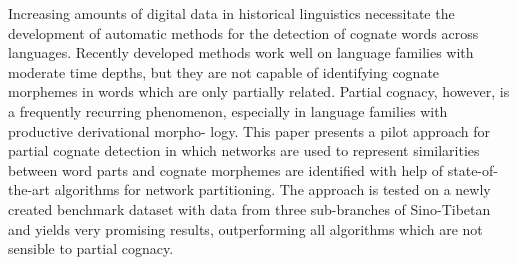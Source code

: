 Increasing amounts of digital data in historical linguistics necessitate the development of automatic methods for the detection of cognate words across languages.  Recently developed methods work well on language families with moderate time depths, but they are not capable of identifying cognate morphemes in words which are only partially related. Partial cognacy, however, is a frequently recurring phenomenon, especially in language families with productive derivational morpho- logy. This paper presents a pilot approach for partial cognate detection in which networks are used to represent similarities between word parts and cognate morphemes are identified with help of state-of-the-art algorithms for network partitioning.  The approach is tested on a newly created benchmark dataset with data from three sub-branches of Sino-Tibetan and yields very promising results, outperforming all algorithms which are not sensible to partial cognacy.
